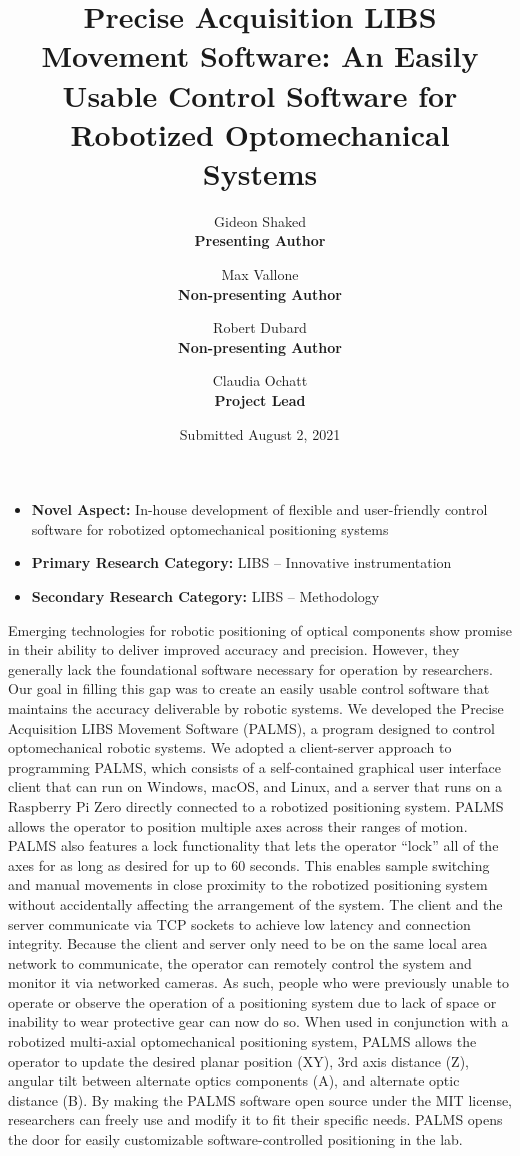 \documentclass[12pt]{article}
\title{Precise Acquisition LIBS Movement Software: An Easily Usable Control Software for Robotized Optomechanical Systems}
\author{
    Gideon Shaked\\
    \textbf{Presenting Author}
    \and
    Max Vallone\\
    \textbf{Non-presenting Author} 
    \and
    Robert Dubard\\
    \textbf{Non-presenting Author}
    \and
    Claudia Ochatt\\
    \textbf{Project Lead}
}
\date{Submitted August 2, 2021}
\begin{document}
    \maketitle

    \begin{itemize}
        \item \textbf{Novel Aspect:} In-house development of flexible and user-friendly control software for robotized optomechanical positioning systems
        \item \textbf{Primary Research Category:} LIBS -- Innovative instrumentation
        \item \textbf{Secondary Research Category:} LIBS -- Methodology
    \end{itemize}

    Emerging technologies for robotic positioning of optical components show promise in their ability to deliver improved accuracy and precision. 
    However, 
    they generally lack the foundational software necessary for operation by researchers. 
    Our goal in filling this gap was to 
    create an easily usable control software that maintains the accuracy deliverable by robotic systems. 
    We developed the Precise Acquisition LIBS Movement Software (PALMS), 
    a program designed to control optomechanical robotic systems. 
    We adopted a client-server approach to programming PALMS\@, 
    which consists of a self-contained graphical user interface client that can run on 
    Windows, 
    macOS, 
    and Linux, 
    and a server that runs on a Raspberry Pi Zero 
    directly connected to a robotized positioning system. 
    PALMS allows the operator to position multiple axes across their ranges of motion. 
    PALMS also features a lock functionality that lets the operator \enquote{lock} all of the axes for as long as desired for up to 60 seconds. 
    This enables sample switching 
    and manual movements 
    in close proximity to the robotized positioning system 
    without accidentally affecting the arrangement of the system. 
    The client and the server communicate via TCP sockets to achieve low latency and connection integrity. 
    Because the client and server only need to be on the same local area network to communicate, 
    the operator can remotely control the system and monitor it via networked cameras. 
    As such, people who were previously unable to operate or observe the operation of a positioning system 
    due to lack of space or inability to wear protective gear 
    can now do so. 
    When used in conjunction with a robotized multi-axial optomechanical positioning system, 
    PALMS allows the operator to update the 
    desired planar position (XY), 
    3rd axis distance (Z), 
    angular tilt between alternate optics components (A), 
    and alternate optic distance (B). 
    By making the PALMS software open source under the MIT license, 
    researchers can freely use and modify it to fit their specific needs. 
    PALMS opens the door for easily customizable software-controlled positioning in the lab.
\end{document}
